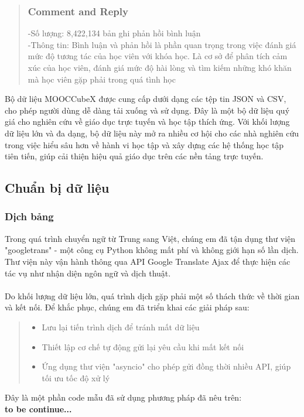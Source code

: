 \begin{quote}
\subsubsection{Comment and Reply}
-Số lượng: 8,422,134 bản ghi phản hồi bình luận\\
-Thông tin: Bình luận và phản hồi là phần quan trọng trong việc đánh giá mức độ tương tác của học viên với khóa học. Là cơ sở để phân tích cảm xúc của học viên, đánh giá mức độ hài lòng và tìm kiếm những khó khăn mà học viên gặp phải trong quá tình học\\
\end{quote}
Bộ dữ liệu MOOCCubeX được cung cấp dưới dạng các tệp tin JSON và CSV, cho phép người dùng dễ dàng tải xuống và sử dụng. Đây là một bộ dữ liệu quý giá cho nghiên cứu về giáo dục trực tuyến và học tập thích ứng. Với khối lượng dữ liệu lớn và đa dạng, bộ dữ liệu này mở ra nhiều cơ hội cho các nhà nghiên cứu trong việc hiểu sâu hơn về hành vi học tập và xây dựng các hệ thống học tập tiên tiến, giúp cải thiện hiệu quả giáo dục trên các nền tảng trực tuyến.\\
\subsection{Chuẩn bị dữ liệu}
\subsubsection{Dịch bảng}
Trong quá trình chuyển ngữ từ Trung sang Việt, chúng em đã tận dụng thư viện "googletrans" - một công cụ Python không mất phí và không giới hạn số lần dịch. Thư viện này vận hành thông qua API Google Translate Ajax để thực hiện các tác vụ như nhận diện ngôn ngữ và dịch thuật.\\
\\
Do khối lượng dữ liệu lớn, quá trình dịch gặp phải một số thách thức về thời gian và kết nối. Để khắc phục, chúng em đã triển khai các giải pháp sau:
\begin{quote}
\begin{itemize}
    \item Lưu lại tiến trình dịch để tránh mất dữ liệu
    \item Thiết lập cơ chế tự động gửi lại yêu cầu khi mất kết nối
    \item Ứng dụng thư viện "asyncio" cho phép gửi đồng thời nhiều API, giúp tối ưu tốc độ xử lý
\end{itemize}
\end{quote}
Đây là một phần code mẫu đã sử dụng phương pháp đã nêu trên:\\
\textbf{to be continue...}\\
